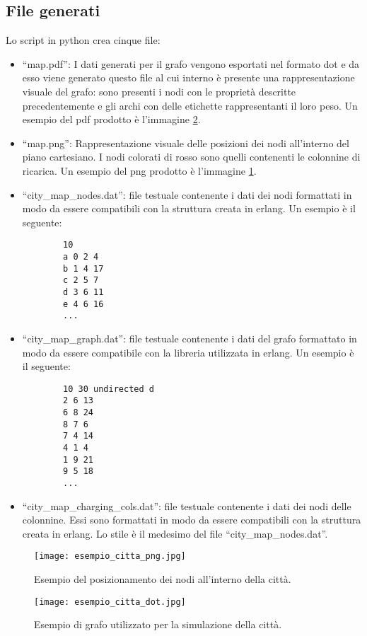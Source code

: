 \subsection{File generati}
Lo script in python crea cinque file:
\begin{itemize}
	\item ``map.pdf'': I dati generati per il grafo vengono esportati nel formato dot e da esso viene generato questo file al cui interno è presente una rappresentazione visuale del grafo: sono presenti i nodi con le proprietà descritte precedentemente e gli archi con delle etichette rappresentanti il loro peso. Un esempio del pdf prodotto è l'immagine \ref{fig:esempio_citta_dot}.
	\item ``map.png'': Rappresentazione visuale delle posizioni dei nodi all'interno del piano cartesiano. I nodi colorati di rosso sono quelli contenenti le colonnine di ricarica. Un esempio del png prodotto è l'immagine \ref{fig:esempio_citta_png}.
	\item ``city\_map\_nodes.dat'': file testuale contenente i dati dei nodi formattati in modo da essere compatibili con la struttura creata in erlang. Un esempio è il seguente:
	\begin{lstlisting}
		10
		a 0 2 4
		b 1 4 17
		c 2 5 7
		d 3 6 11
		e 4 6 16
		...
	\end{lstlisting}
	\item ``city\_map\_graph.dat'': file testuale contenente i dati del grafo formattato in modo da essere compatibile con la libreria utilizzata in erlang. Un esempio è il seguente:
	\begin{lstlisting}
		10 30 undirected d
		2 6 13
		6 8 24
		8 7 6
		7 4 14
		4 1 4
		1 9 21
		9 5 18
		...
	\end{lstlisting}
	\item ``city\_map\_charging\_cols.dat'': file testuale contenente i dati dei nodi delle colonnine. Essi sono formattati in modo da essere compatibili con la struttura creata in erlang. Lo stile è il medesimo del file ``city\_map\_nodes.dat''.
	
\end{itemize}

\begin{figure}[htbp]
	\centering
	\texttt{[image: esempio\_citta\_png.jpg]}
	\caption{Esempio del posizionamento dei nodi all'interno della città.}
	\label{fig:esempio_citta_png}
\end{figure}

\begin{figure}[htbp]
	\centering
	\texttt{[image: esempio\_citta\_dot.jpg]}
	\caption{Esempio di grafo utilizzato per la simulazione della città.}
	\label{fig:esempio_citta_dot}
\end{figure}

